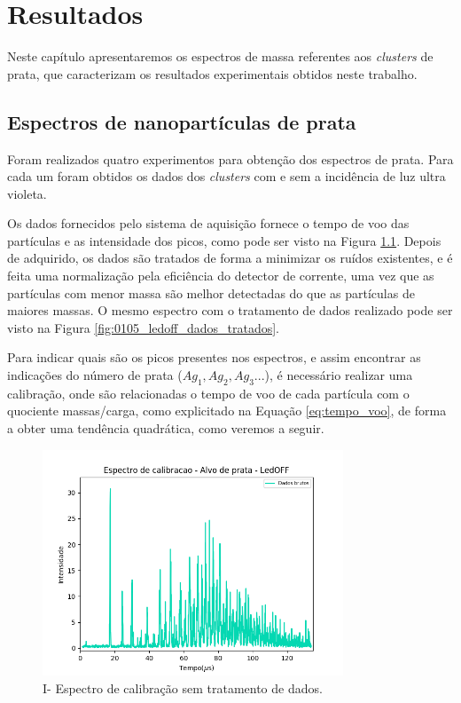 \chapter{Resultados}
\label{resultados}

Neste capítulo apresentaremos os espectros de massa referentes aos \textit{clusters} de prata, que caracterizam os resultados experimentais obtidos neste trabalho.

\section{Espectros de nanopartículas de prata}
\label{sec:result_producao_cluster}
Foram realizados quatro experimentos para obtenção dos espectros de prata. Para cada um foram obtidos os dados dos \textit{clusters} com e sem a incidência de luz ultra violeta. 

Os dados fornecidos pelo sistema de aquisição
fornece o tempo de voo das partículas e as intensidade dos picos, como pode ser visto na Figura \ref{fig:ex_dados_brutos}. Depois de adquirido, os dados são tratados de forma a minimizar os ruídos existentes, e é feita uma normalização pela eficiência do detector de corrente, uma vez que as partículas com menor massa são melhor detectadas do que as partículas de maiores massas. O mesmo espectro com o tratamento de dados realizado pode ser visto na Figura \ref{fig:0105_ledoff_dados_tratados}.






Para indicar quais são os picos presentes nos espectros, e assim encontrar as indicações do número de prata ($Ag_{1},Ag_{2},Ag_{3}...$), é necessário realizar uma calibração, onde são relacionadas o tempo de voo de cada partícula com o quociente massas/carga, como explicitado na Equação \ref{eq:tempo_voo}, de forma a obter uma tendência quadrática, como veremos a seguir.

\begin{figure}
  \centering  
  \includegraphics[width=0.8\textwidth]{exp_01/LedOFF_sem_tratamento.png}
  \caption{I- Espectro de calibração sem tratamento de dados.}
  \label{fig:ex_dados_brutos} 
\end{figure}

